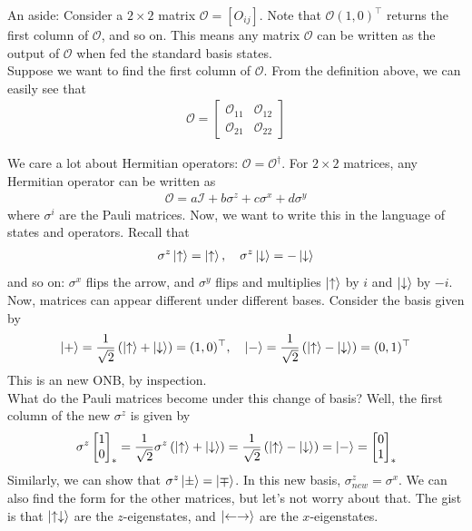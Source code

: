 \documentclass{book}
\theoremstyle{definition}
\newcommand{\f}[2]{\frac{#1}{#2}}
\newcommand{\lp}{\left(}
\newcommand{\rp}{\right)}
\newcommand{\Id}{\mathcal{I}}
\begin{document}
An aside: Consider a $2\times 2$ matrix $\mathcal{O} = [O_{ij}]$. Note that $\mathcal{O}(1,0)^\top$ returns the first column of $\mathcal{O}$, and so on. This means any matrix $\mathcal{O}$ can be written as the output of $\mathcal{O}$ when fed the standard basis states. \\

Suppose we want to find the first column of $\mathcal{O}$. From the definition above, we can easily see that
\begin{align}
\mathcal{O} = \begin{bmatrix}
\mathcal{O}_{11} & \mathcal{O}_{12} \\ \mathcal{O}_{21} & \mathcal{O}_{22}
\end{bmatrix}
\end{align}


We care a lot about Hermitian operators: $\mathcal{O} = \mathcal{O}^\dagger$. For $2\times 2$ matrices, any Hermitian operator can be written as 
\begin{align}
\mathcal{O} = a\Id + b\sigma^z + c\sigma^x + d\sigma^y
\end{align}
where $\sigma^i$ are the Pauli matrices. Now, we want to write this in the language of states and operators. Recall that 
\begin{align}
\sigma^z\ket{\uparrow} = \ket{\uparrow}, \quad \sigma^z\ket{\downarrow} = -\ket{\downarrow}
\end{align}
and so on: $\sigma^x$ flips the arrow, and $\sigma^y$ flips and multiplies $\ket{\uparrow}$ by $i$ and $\ket{\downarrow}$ by $-i$. \\

Now, matrices can appear different under different bases. Consider the basis given by
\begin{align}
\ket{+} = \f{1}{\sqrt{2}}\lp \ket{\uparrow} + \ket{\downarrow} \rp = (1,0)^\top, \quad
\ket{-} = \f{1}{\sqrt{2}}\lp \ket{\uparrow} - \ket{\downarrow} \rp = (0,1)^\top
\end{align}
This is an new ONB, by inspection. \\
 
What do the Pauli matrices become under this change of basis? Well, the first column of the new $\sigma^z$ is given by
\begin{align}
\sigma^z\begin{bmatrix}
1\\0
\end{bmatrix}_* = \f{1}{\sqrt{2}} \sigma^z \lp \ket{\uparrow} +  \ket{\downarrow} \rp = \f{1}{\sqrt{2}}\lp \ket{\uparrow} - \ket{\downarrow} \rp  =\ket{-} = \begin{bmatrix}
0\\1
\end{bmatrix}_*
\end{align}
Similarly, we can show that $\sigma^z\ket{\pm} = \ket{\mp}$. In this new basis, $\sigma^z_{new} = \sigma^x$. We can also find the form for the other matrices, but let's not worry about that. The gist is that $\ket{\uparrow\downarrow}$ are the $z$-eigenstates, and $\ket{\leftarrow\rightarrow}$ are the $x$-eigenstates. \\
\end{document}

